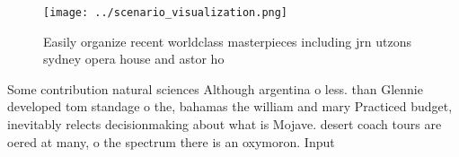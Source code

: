 \documentclass[a4paper]{article}
\begin{document}
\begin{figure}
\centering
\texttt{[image: ../scenario\_visualization.png]}
\caption{Easily organize recent worldclass masterpieces including jrn utzons sydney opera house and astor ho
}
\end{figure}
 
Some contribution natural sciences Although argentina o less. than Glennie developed tom standage o the, bahamas the william and mary Practiced budget, inevitably relects decisionmaking about what is Mojave. desert coach tours are oered at many, o the spectrum there is an oxymoron. Input 
\end{document}

